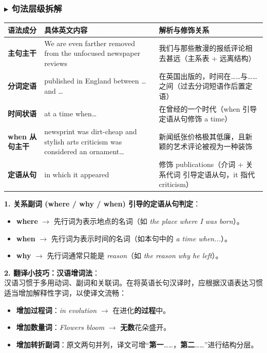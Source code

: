 \documentclass[cn,normal,11pt]{elegantnote}
\newcommand{\retrokey}[1]{{\color{accentcolor}\textbf{#1}}}
\begin{document}
\subsubsection*{$\blacktriangleright$ 句法层级拆解}
\noindent
\begin{tabularx}{\textwidth}{p{3.2cm} X X}
  \toprule
  \textbf{语法成分} & \textbf{具体英文内容} & \textbf{解析与修饰关系} \\
  \midrule
  \textbf{主句主干} & We are even farther removed from the unfocused newspaper reviews & 我们与那些散漫的报纸评论相去甚远（主系表 + 远离结构） \\
  \midrule
  \textbf{分词定语} & published in England between … and … & 在英国出版的，时间在……与……之间（过去分词短语作后置定语） \\
  \midrule
  \textbf{时间状语} & at a time when… & 在曾经的一个时代（when 引导定语从句修饰 a time） \\
  \midrule
  \textbf{when 从句主干} & newsprint was dirt-cheap and stylish arts criticism was considered an ornament… & 新闻纸张价格极其低廉，且新颖的艺术评论被视为一种装饰 \\
  \midrule
  \textbf{定语从句} & in which it appeared & 修饰 publications（介词 + 关系代词 引导定语从句，it 指代 criticism） \\
  \bottomrule
\end{tabularx}

\begin{proposition}[定语从句关系副词与汉语翻译增词法]
  \textbf{1. 关系副词 (where / why / when) 引导的定语从句判定}：
  \begin{itemize}
    \item \textbf{where} $\rightarrow$ 先行词为表示地点的名词（如 \textit{the place where I was born}）。
    \item \textbf{when} $\rightarrow$ 先行词为表示时间的名词（如本句中的 \textit{a time when...}）。
    \item \textbf{why} $\rightarrow$ 先行词通常只能是 \textit{reason}（如 \textit{the reason why he left}）。
  \end{itemize}
  \textbf{2. 翻译小技巧：汉语增词法}：\\
  汉语习惯于多用动词、副词和关联词。在将英语长句汉译时，应根据汉语表达习惯适当增加解释性字词，以使译文流畅：
  \begin{itemize}
    \item \textbf{增加过程词}：\textit{in evolution} $\rightarrow$ 在进化\retrokey{的过程}中。
    \item \textbf{增加数量词}：\textit{Flowers bloom} $\rightarrow$ \retrokey{无数}花朵盛开。
    \item \textbf{增加转折副词}：原文两句并列，译文可增“\retrokey{第一}……，\retrokey{第二}……”进行结构分层。
  \end{itemize}
\end{proposition}
\end{document}
